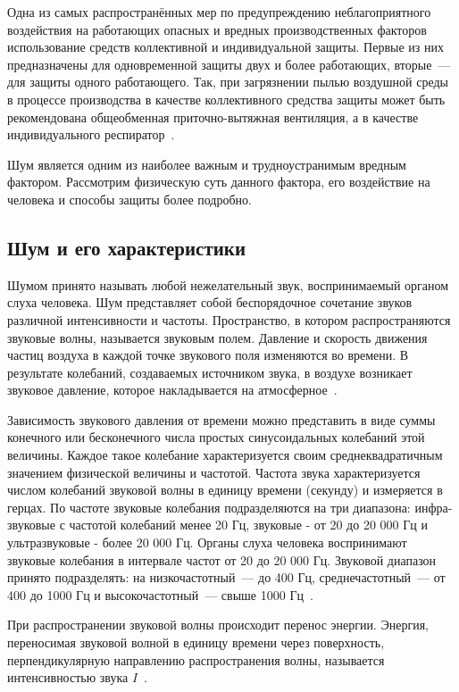 Одна из самых распространённых мер по предупреждению неблагоприятного воздействия на работающих опасных и вредных производственных факторов использование средств коллективной и индивидуальной защиты. Первые из них предназначены для одновременной защиты двух и более работающих, вторые~--- для защиты одного работающего. Так, при загрязнении пылью воздушной среды в процессе производства в качестве коллективного средства защиты может быть рекомендована общеобменная приточно-вытяжная вентиляция, а в качестве индивидуального респиратор~\cite{MSTUCA_OT}.

Шум является одним из наиболее важным и трудноустранимым вредным фактором. Рассмотрим физическую суть данного фактора, его воздействие на человека и способы защиты более подробно.

\subsection{Шум и его характеристики}
Шумом принято называть любой нежелательный звук, воспринимаемый органом слуха человека. Шум представляет собой беспорядочное сочетание звуков различной интенсивности и частоты. Пространство, в котором распространяются звуковые волны, называется звуковым полем. Давление и скорость движения частиц воздуха в каждой точке звукового поля изменяются во времени. В результате колебаний, создаваемых источником звука, в воздухе возникает звуковое давление, которое накладывается на атмосферное~\cite{TechLib_NoiseCharacteristics}.

Зависимость звукового давления от времени можно представить в виде суммы конечного или бесконечного числа простых синусоидальных колебаний этой величины. Каждое такое колебание характеризуется своим среднеквадратичным значением физической величины и частотой. Частота звука характеризуется числом колебаний звуковой волны в единицу времени (секунду) и измеряется в герцах. По частоте звуковые колебания подразделяются на три диапазона: инфра-звуковые с частотой колебаний менее 20 Гц, звуковые - от 20 до 20 000 Гц и ультразвуковые - более 20 000 Гц. Органы слуха человека воспринимают звуковые колебания в интервале частот от 20 до 20 000 Гц. Звуковой диапазон принято подразделять: на низкочастотный~--- до 400 Гц, среднечастотный~--- от 400 до 1000 Гц и высокочастотный~--- свыше 1000 Гц~\cite{TechLib_NoiseCharacteristics}.

При распространении звуковой волны происходит перенос энергии. Энергия, переносимая звуковой волной в единицу времени через поверхность, перпендикулярную направлению распространения волны, называется интенсивностью звука $I$~\cite{TechLib_NoiseCharacteristics}.

